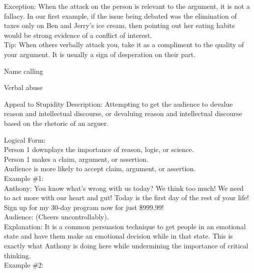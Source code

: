 \documentclass[a4paper,12pt,single,pdftex]{scrbook}
\begin{document}
{    
      Exception: When the attack on the person is relevant to the argument, it is not a fallacy.  In our first example, if the issue being debated was the elimination of taxes only on Ben and Jerry’s ice cream, then pointing out her eating habits would be strong evidence of a conflict of interest.
    \\

    
      Tip: When others verbally attack you, take it as a compliment to the quality of your argument.  It is usually a sign of desperation on their part.
    \\

  }


Name calling

Verbal abuse

Appeal to Stupidity
    Description: Attempting to get the audience to devalue reason and intellectual discourse, or devaluing reason and intellectual discourse based on the rhetoric of an arguer.

    
      Logical Form:
    \\

    
      Person 1 downplays the importance of reason, logic, or science.
    \\

    
      Person 1 makes a claim, argument, or assertion.
    \\

    
      Audience is more likely to accept claim, argument, or assertion.
    \\

    
      Example \#1:
    \\

    
      Anthony: You know what's wrong with us today? We think too much! We need to act more with our heart and gut! Today is the first day of the rest of your life! Sign up for my 30-day program now for just \$999.99!
    \\

    
      Audience: (Cheers uncontrollably).
    \\

    
      Explanation: It is a common persuasion technique to get people in an emotional state and have them make an emotional decision while in that state. This is exactly what Anthony is doing here while undermining the importance of critical thinking.
    \\

    
      Example \#2:
    \\
\end{document}
